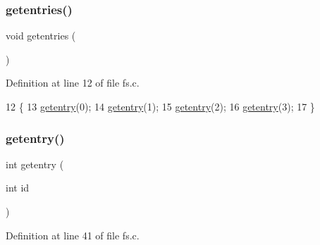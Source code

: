 \mbox{\label{a00152_a414110036132977c34813673360e1a63_a414110036132977c34813673360e1a63}} 
\subsubsection{\texorpdfstring{getentries()}{getentries()}}
{\footnotesize\ttfamily void getentries (\begin{DoxyParamCaption}{ }\end{DoxyParamCaption})}



Definition at line 12 of file fs.\+c.


\begin{DoxyCode}
12                   \{
13     \hyperlink{a00149_a3fb32d07d3bd05144a196c94fc59c0d1_a3fb32d07d3bd05144a196c94fc59c0d1}{getentry}(0);
14     \hyperlink{a00149_a3fb32d07d3bd05144a196c94fc59c0d1_a3fb32d07d3bd05144a196c94fc59c0d1}{getentry}(1);
15     \hyperlink{a00149_a3fb32d07d3bd05144a196c94fc59c0d1_a3fb32d07d3bd05144a196c94fc59c0d1}{getentry}(2);
16     \hyperlink{a00149_a3fb32d07d3bd05144a196c94fc59c0d1_a3fb32d07d3bd05144a196c94fc59c0d1}{getentry}(3);
17 \}
\end{DoxyCode}
\mbox{\label{a00152_a3fb32d07d3bd05144a196c94fc59c0d1_a3fb32d07d3bd05144a196c94fc59c0d1}} 
\subsubsection{\texorpdfstring{getentry()}{getentry()}}
{\footnotesize\ttfamily int getentry (\begin{DoxyParamCaption}\item[{int}]{id }\end{DoxyParamCaption})}



Definition at line 41 of file fs.\+c.


